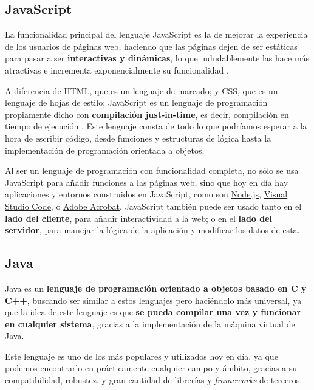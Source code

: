 \subsection{JavaScript}

La funcionalidad principal del lenguaje JavaScript es la de mejorar la experiencia de los usuarios de páginas web, haciendo que las páginas dejen de ser estáticas para pasar a ser \textbf{interactivas y dinámicas}, lo que indudablemente las hace más atractivas e incrementa exponencialmente su funcionalidad \cite{aws:javascript}.

A diferencia de HTML, que es un lenguaje de marcado; y CSS, que es un lenguaje de hojas de estilo; JavaScript es un lenguaje de programación propiamente dicho con \textbf{compilación just-in-time}, es decir, compilación en tiempo de ejecución \cite{mdn:javascript}. Este lenguaje consta de todo lo que podríamos esperar a la hora de escribir código, desde funciones y estructuras de lógica hasta la implementación de programación orientada a objetos.

Al ser un lenguaje de programación con funcionalidad completa, no sólo se usa JavaScript para añadir funciones a las páginas web, sino que hoy en día hay aplicaciones y entornos construidos en JavaScript, como son \href{https://nodejs.org/en}{Node.js}, \href{https://code.visualstudio.com/}{Visual Studio Code}, o \href{https://www.adobe.com/es/acrobat.html}{Adobe Acrobat}. JavaScript también puede ser usado tanto en el \textbf{lado del cliente}, para añadir interactividad a la web; o en el \textbf{lado del servidor}, para manejar la lógica de la aplicación y modificar los datos de esta.

\subsection{Java}

Java es un \textbf{lenguaje de programación orientado a objetos basado en C y C++}, buscando ser similar a estos lenguajes pero haciéndolo más universal, ya que la idea de este lenguaje es que \textbf{se pueda compilar una vez y funcionar en cualquier sistema}, gracias a la implementación de la máquina virtual de Java.

 Este lenguaje es uno de los más populares y utilizados hoy en día, ya que podemos encontrarlo en prácticamente cualquier campo y ámbito, gracias a su compatibilidad, robustez, y gran cantidad de librerías y \textit{frameworks} de terceros. \cite{aws:java}
 
